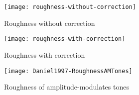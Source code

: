 \documentclass[a4paper]{article}
\begin{document}
\begin{figure}[ht]
    \centering
    \begin{minipage}[b]{0.45\linewidth}
        \centering
        \texttt{[image: roughness-without-correction]}
        \caption{Roughness without correction}
        \label{fig:rwoc}
    \end{minipage}
    \quad
    \begin{minipage}[b]{0.45\linewidth}
        \centering
        \texttt{[image: roughness-with-correction]}
        \caption{Roughness with correction}
        \label{fig:rwc}
    \end{minipage}
\end{figure}

\begin{figure}[ht]
    \centering
    \texttt{[image: Daniel1997-RoughnessAMTones]}
    \caption{Roughness of amplitude-modulates tones
        \cite[pp.~118]{daniel1997psychoacoustical}}
    \label{fig:rorigfig}
\end{figure}



\end{document}
